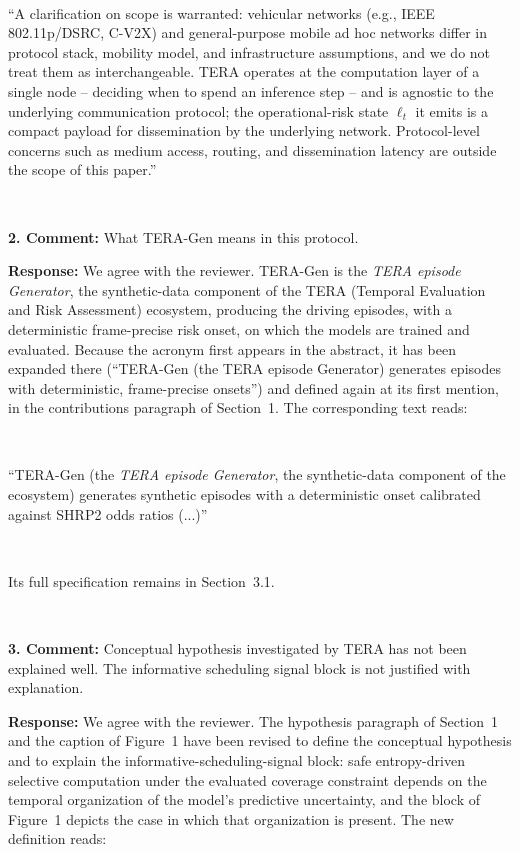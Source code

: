 \documentclass[1p,12pt,authoryear]{elsarticle}
\begin{document}
~

``A clarification on scope is warranted: vehicular networks (e.g., IEEE 802.11p/DSRC, C-V2X) and general-purpose mobile ad hoc networks differ in protocol stack, mobility model, and infrastructure assumptions, and we do not treat them as interchangeable. TERA operates at the computation layer of a single node -- deciding when to spend an inference step -- and is agnostic to the underlying communication protocol; the operational-risk state $\ell_t$ it emits is a compact payload for dissemination by the underlying network. Protocol-level concerns such as medium access, routing, and dissemination latency are outside the scope of this paper.''

~

\noindent \textbf{2. Comment:} What TERA-Gen means in this protocol.

\vspace{2mm}
\noindent \textbf{Response:} We agree with the reviewer. TERA-Gen is the \emph{TERA episode Generator}, the synthetic-data component of the TERA (Temporal Evaluation and Risk Assessment) ecosystem, producing the driving episodes, with a deterministic frame-precise risk onset, on which the models are trained and evaluated. Because the acronym first appears in the abstract, it has been expanded there (``TERA-Gen (the TERA episode Generator) generates episodes with deterministic, frame-precise onsets'') and defined again at its first mention, in the contributions paragraph of Section~1. The corresponding text reads:

~

``TERA-Gen (the \emph{TERA episode Generator}, the synthetic-data component of the ecosystem) generates synthetic episodes with a deterministic onset calibrated against SHRP2 odds ratios (...)''

~

\noindent Its full specification remains in Section~3.1.

~

\noindent \textbf{3. Comment:} Conceptual hypothesis investigated by TERA has not been explained well. The informative scheduling signal block is not justified with explanation.

\vspace{2mm}
\noindent \textbf{Response:} We agree with the reviewer. The hypothesis paragraph of Section~1 and the caption of Figure~1 have been revised to define the conceptual hypothesis and to explain the informative-scheduling-signal block: safe entropy-driven selective computation under the evaluated coverage constraint depends on the temporal organization of the model's predictive uncertainty, and the block of Figure~1 depicts the case in which that organization is present. The new definition reads:
\end{document}
